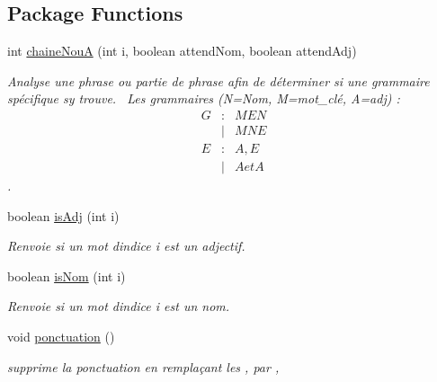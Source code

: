 \subsection*{Package Functions}
\begin{DoxyCompactItemize}
\item 
int \hyperlink{class_a_s_p_1_1_a_s_p_abb4c809e7a132c07a221e5259ff56fb7}{chaine\+NouA} (int i, boolean attend\+Nom, boolean attend\+Adj)
\begin{DoxyCompactList}\small\item\em Analyse une phrase ou partie de phrase afin de déterminer si une grammaire spécifique s\textquotesingle{}y trouve.~\newline
 Les grammaires (N=Nom, M=mot\+\_\+clé, A=adj) \+:~\newline
 \begin{eqnarray*} G &:& M E N \\ &|& M N E \\ E &:& A , E \\ &|& A et A \end{eqnarray*}. \end{DoxyCompactList}\item 
boolean \hyperlink{class_a_s_p_1_1_a_s_p_a65f26d49f089c2d677728d016996c678}{is\+Adj} (int i)
\begin{DoxyCompactList}\small\item\em Renvoie si un mot d\textquotesingle{}indice i est un adjectif. \end{DoxyCompactList}\item 
boolean \hyperlink{class_a_s_p_1_1_a_s_p_a3c159a11f0c4a516703338bc61a1fc00}{is\+Nom} (int i)
\begin{DoxyCompactList}\small\item\em Renvoie si un mot d\textquotesingle{}indice i est un nom. \end{DoxyCompactList}\item 
void \hyperlink{class_a_s_p_1_1_a_s_p_a3de1b0cdae9512eb3c798ab15f41353c}{ponctuation} ()\hypertarget{class_a_s_p_1_1_a_s_p_a3de1b0cdae9512eb3c798ab15f41353c}{}\label{class_a_s_p_1_1_a_s_p_a3de1b0cdae9512eb3c798ab15f41353c}

\begin{DoxyCompactList}\small\item\em supprime la ponctuation en remplaçant les \textquotesingle{},\textquotesingle{} par \textquotesingle{} ,\textquotesingle{} \end{DoxyCompactList}\end{DoxyCompactItemize}
